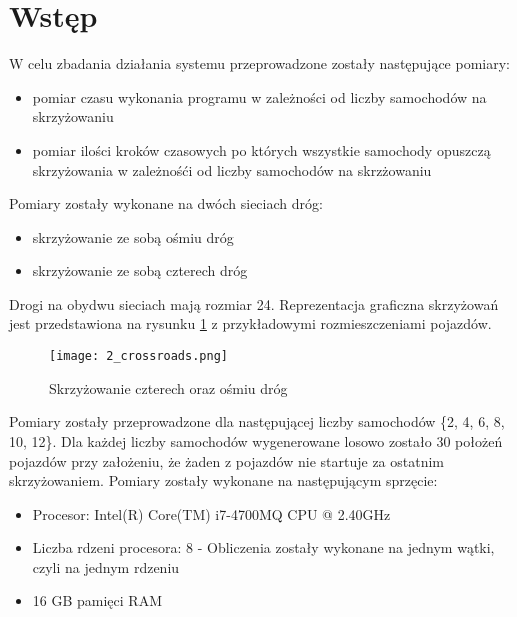  \label{chap:outcomes}

\section{Wstęp}

W celu zbadania działania systemu przeprowadzone zostały następujące pomiary:

\begin{itemize}
\item pomiar czasu wykonania programu w zależności od liczby samochodów na skrzyżowaniu 
\item pomiar ilości kroków czasowych po których wszystkie samochody opuszczą skrzyżowania w zależnośći od liczby samochodów na skrzżowaniu
\end{itemize}

Pomiary zostały wykonane na dwóch sieciach dróg:
\begin{itemize}
\item skrzyżowanie ze sobą ośmiu dróg
\item skrzyżowanie ze sobą czterech dróg
\end{itemize}

Drogi na obydwu sieciach mają rozmiar 24.
\newline
\newline
Reprezentacja graficzna skrzyżowań jest przedstawiona na rysunku \ref{both-crossroads} z przykładowymi rozmieszczeniami pojazdów.
\begin{figure}[H]
    \texttt{[image: 2\_crossroads.png]}
  \caption{Skrzyżowanie czterech oraz ośmiu dróg}
  \label{both-crossroads}
\end{figure}

Pomiary zostały przeprowadzone dla następującej liczby samochodów \{2, 4, 6, 8, 10, 12\}.
\newline
\newline
Dla każdej liczby samochodów wygenerowane losowo zostało 30 położeń pojazdów przy założeniu, że żaden z pojazdów nie startuje za ostatnim skrzyżowaniem.
\newline
\newline
Pomiary zostały wykonane na następującym sprzęcie:
\begin{itemize}
\item Procesor: Intel(R) Core(TM) i7-4700MQ CPU @ 2.40GHz
\item Liczba rdzeni procesora: 8 - Obliczenia zostały wykonane na jednym wątki, czyli na jednym rdzeniu
\item 16 GB pamięci RAM
\end{itemize}

